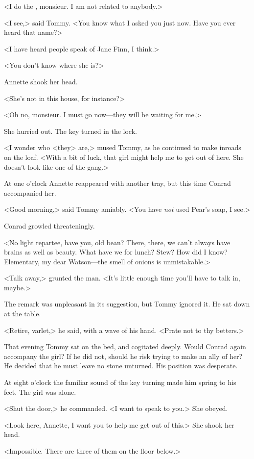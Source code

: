 <I do the , monsieur. I am not related to anybody.>

<I see,> said Tommy. <You know what I asked you just now. Have you ever heard that name?>

<I have heard people speak of Jane Finn, I think.>

<You don't know where she is?>

Annette shook her head.

<She's not in this house, for instance?>

<Oh no, monsieur. I must go now—they will be waiting for me.>

She hurried out. The key turned in the lock.

<I wonder who <they> are,> mused Tommy, as he continued to make inroads on the loaf. <With a bit of luck, that girl might help me to get out of here. She doesn't look like one of the gang.>

At one o'clock Annette reappeared with another tray, but this time Conrad accompanied her.

<Good morning,> said Tommy amiably. <You have \emph{not} used Pear's soap, I see.>

Conrad growled threateningly.

<No light repartee, have you, old bean? There, there, we can't always have brains as well as beauty. What have we for lunch? Stew? How did I know? Elementary, my dear Watson—the smell of onions is unmistakable.>

<Talk away,> grunted the man. <It's little enough time you'll have to talk in, maybe.>

The remark was unpleasant in its suggestion, but Tommy ignored it. He sat down at the table.

<Retire, varlet,> he said, with a wave of his hand. <Prate not to thy betters.>

That evening Tommy sat on the bed, and cogitated deeply. Would Conrad again accompany the girl? If he did not, should he risk trying to make an ally of her? He decided that he must leave no stone unturned. His position was desperate.

At eight o'clock the familiar sound of the key turning made him spring to his feet. The girl was alone.

<Shut the door,> he commanded. <I want to speak to you.> She obeyed.

<Look here, Annette, I want you to help me get out of this.> She shook her head.

<Impossible. There are three of them on the floor below.>

